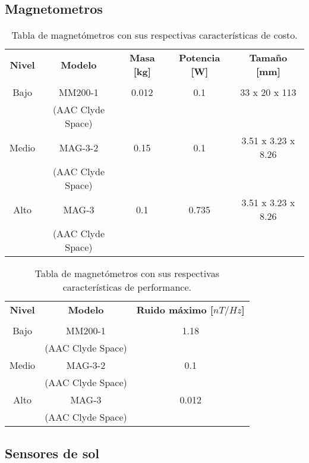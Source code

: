 \subsection{Magnetometros}


\begin{table}[H]
	\centering
	\caption{Tabla de magnetómetros con sus respectivas características de costo.}
	\begin{tabular}{|c|c|c|c|c|}
		\hline
		\textbf{Nivel} & \textbf{Modelo} & \textbf{Masa [kg]} & \textbf{Potencia [W]} & \textbf{Tamaño [mm]}  \\
		& &  &  &   \\ \hline
		Bajo & MM200-1 \cite{ref50} & 0.012  & 0.1 & 33 x 20 x 113 \\
		& (AAC Clyde Space) &  &  &  \\ \hline
		Medio & MAG-3-2 \cite{ref51} & 0.15 & 0.1 & 3.51 x 3.23 x 8.26  \\
		& (AAC Clyde Space) & &  &  \\ \hline
		Alto & MAG-3 \cite{ref52} & 0.1 & 0.735 & 3.51 x 3.23 x 8.26  \\
		& (AAC Clyde Space) & &  &   \\ \hline
	\end{tabular}
	
\end{table}

\begin{table}[H]
	\centering
	\caption{Tabla de magnetómetros con sus respectivas características de performance.}
	\begin{tabular}{|c|c|c|}
		\hline
		\textbf{Nivel} & \textbf{Modelo} & \textbf{Ruido máximo [$nT/Hz$]}  \\
		& &    \\ \hline
		Bajo & MM200-1 & 1.18   \\
		& (AAC Clyde Space) &   \\ \hline
		Medio & MAG-3-2 & 0.1  \\
		& (AAC Clyde Space) &   \\ \hline
		Alto & MAG-3 & 0.012   \\
		& (AAC Clyde Space) &    \\ \hline
	\end{tabular}
	
\end{table}

\subsection{Sensores de sol}


